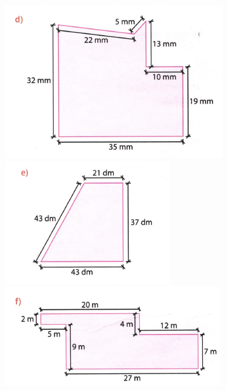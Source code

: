 \documentclass[a4paper,14pt]{article}
\begin{document}
\begin{multicols}{2}
\begin{enumerate}
			\includegraphics[width=1\linewidth]{6FMA89_imagens/imagem04}
			\includegraphics[width=1\linewidth]{6FMA89_imagens/imagem05}
			\includegraphics[width=1\linewidth]{6FMA89_imagens/imagem06}\\

\end{enumerate}
\end{multicols}
\end{document}

